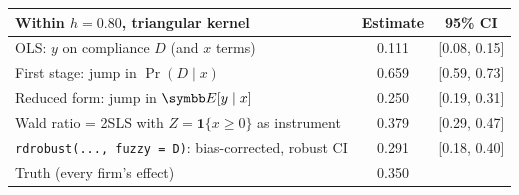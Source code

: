 \begin{tabular}{lcc}\toprule
Within $h = 0.80$, triangular kernel & Estimate & 95\% CI \\ \midrule
OLS: $y$ on compliance $D$ (and $x$ terms) & 0.111 & [0.08, 0.15] \\
First stage: jump in $\Pr(D \mid x)$ & 0.659 & [0.59, 0.73] \\
Reduced form: jump in $\E[y \mid x]$ & 0.250 & [0.19, 0.31] \\
Wald ratio = 2SLS with $Z = \mathbf{1}\{x \ge 0\}$ as instrument & 0.379 & [0.29, 0.47] \\
\texttt{rdrobust(..., fuzzy = D)}: bias-corrected, robust CI & 0.291 & [0.18, 0.40] \\
\midrule
Truth (every firm's effect) & 0.350 &  \\
\bottomrule\end{tabular}
